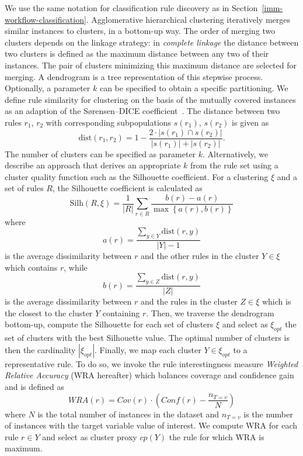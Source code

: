 \documentclass[
  oneside]{book}
\begin{document}
We use the same notation for classification rule discovery as in Section~\ref{imm-workflow-classification}.
Agglomerative hierarchical clustering iteratively merges similar instances to clusters, in a bottom-up way.
The order of merging two clusters depends on the linkage strategy: in \emph{complete linkage} the distance between two clusters is defined as the maximum distance between any two of their instances.
The pair of clusters minimizing this maximum distance are selected for merging.
A dendrogram is a tree representation of this stepwise process.
Optionally, a parameter \(k\) can be specified to obtain a specific partitioning.
We define rule similarity for clustering on the basis of the mutually covered instances as an adaption of the Sørensen--DICE coefficient~\autocite{Dice45}.
The distance between two rules \(r_1\), \(r_2\) with corresponding subpopulations \(s(r_1)\), \(s(r_2)\) is given as
\begin{equation}
\text{dist}(r_1,r_2) = 1 - \frac{2\cdot\left|s(r_1)\cap s(r_2)\right|}{\left|s(r_1)\right| + \left|s(r_2)\right|}.
\label{eq:dice}
\end{equation}
The number of clusters can be specified as parameter \(k\).
Alternatively, we describe an approach that derives an appropriate \(k\) from the rule set using a cluster quality function such as the Silhouette coefficient.
For a clustering \(\xi\) and a set of rules \(R\), the Silhouette coefficient is calculated as
\begin{equation}
\text{Silh}(R,\xi) = \frac{1}{|R|}\sum_{r\in R}{\frac{b(r)-a(r)}{\max\left\{a(r), b(r)\right\}}}
\label{eq:silh}
\end{equation}
where
\begin{equation}
a(r)=\frac{\sum_{y\in{}Y}\text{dist}(r,y)}{|Y|-1}
\label{eq:silh-a}
\end{equation}
is the average dissimilarity between \(r\) and the other rules in the cluster \(Y\in\xi\) which contains \(r\), while
\begin{equation}
b(r)=\frac{\sum_{y\in{}Z}\text{dist}(r,y)}{|Z|}
\label{eq:silh-b}
\end{equation}
is the average dissimilarity between \(r\) and the rules in the cluster \(Z\in\xi\) which is the closest to the cluster \(Y\) containing \(r\).
Then, we traverse the dendrogram bottom-up, compute the Silhouette for each set of clusters \(\xi\) and select as \(\xi_{opt}\) the set of clusters with the best Silhouette value.
The optimal number of clusters is then the cardinality \(|\xi_{opt}|\).
Finally, we map each cluster \(Y\in\xi_{opt}\) to a representative rule.
To do so, we invoke the rule interestingness measure \emph{Weighted Relative Accuracy} (WRA hereafter) which balances coverage and confidence gain and is defined as
\begin{equation}
WRA(r)=Cov(r)\cdot\left(Conf(r)-\frac{n_{T=v}}{N}\right)
\label{eq:wra}
\end{equation}
where \(N\) is the total number of instances in the dataset and \(n_{T=v}\) is the number of instances with the target variable value of interest.
We compute WRA for each rule \(r\in{Y}\) and select as cluster proxy \(cp(Y)\) the rule for which WRA is maximum.
\end{document}
